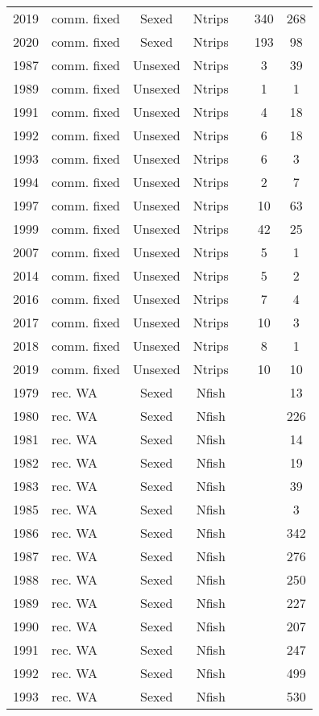 \begin{longtable}[t]{c>{\centering\arraybackslash}p{3cm}ccccc}
2019 & comm. fixed & Sexed & Ntrips &  & 340 & 268\\
2020 & comm. fixed & Sexed & Ntrips &  & 193 & 98\\
1987 & comm. fixed & Unsexed & Ntrips &  & 3 & 39\\
1989 & comm. fixed & Unsexed & Ntrips &  & 1 & 1\\
1991 & comm. fixed & Unsexed & Ntrips &  & 4 & 18\\
1992 & comm. fixed & Unsexed & Ntrips &  & 6 & 18\\
1993 & comm. fixed & Unsexed & Ntrips &  & 6 & 3\\
1994 & comm. fixed & Unsexed & Ntrips &  & 2 & 7\\
1997 & comm. fixed & Unsexed & Ntrips &  & 10 & 63\\
1999 & comm. fixed & Unsexed & Ntrips &  & 42 & 25\\
2007 & comm. fixed & Unsexed & Ntrips &  & 5 & 1\\
2014 & comm. fixed & Unsexed & Ntrips &  & 5 & 2\\
2016 & comm. fixed & Unsexed & Ntrips &  & 7 & 4\\
2017 & comm. fixed & Unsexed & Ntrips &  & 10 & 3\\
2018 & comm. fixed & Unsexed & Ntrips &  & 8 & 1\\
2019 & comm. fixed & Unsexed & Ntrips &  & 10 & 10\\
1979 & rec. WA & Sexed & Nfish &  &  & 13\\
1980 & rec. WA & Sexed & Nfish &  &  & 226\\
1981 & rec. WA & Sexed & Nfish &  &  & 14\\
1982 & rec. WA & Sexed & Nfish &  &  & 19\\
1983 & rec. WA & Sexed & Nfish &  &  & 39\\
1985 & rec. WA & Sexed & Nfish &  &  & 3\\
1986 & rec. WA & Sexed & Nfish &  &  & 342\\
1987 & rec. WA & Sexed & Nfish &  &  & 276\\
1988 & rec. WA & Sexed & Nfish &  &  & 250\\
1989 & rec. WA & Sexed & Nfish &  &  & 227\\
1990 & rec. WA & Sexed & Nfish &  &  & 207\\
1991 & rec. WA & Sexed & Nfish &  &  & 247\\
1992 & rec. WA & Sexed & Nfish &  &  & 499\\
1993 & rec. WA & Sexed & Nfish &  &  & 530\\

\end{longtable}
